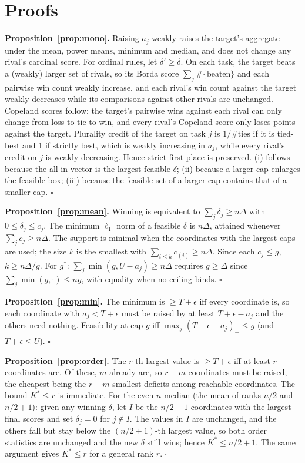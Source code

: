 \documentclass{article}
\theoremstyle{remark}
\begin{document}
\section{Proofs}\label{app:proofs}
\textbf{Proposition~\ref{prop:mono}.} Raising $a_j$ weakly raises the target's aggregate under the mean, power means, minimum and median, and does not change any rival's cardinal score. For ordinal rules, let $\delta'\ge\delta$. On each task, the target beats a (weakly) larger set of rivals, so its Borda score $\sum_j\#\{\text{beaten}\}$ and each pairwise win count weakly increase, and each rival's win count against the target weakly decreases while its comparisons against other rivals are unchanged. Copeland scores follow: the target's pairwise wins against each rival can only change from loss to tie to win, and every rival's Copeland score only loses points against the target. Plurality credit of the target on task $j$ is $1/\#\text{ties}$ if it is tied-best and 1 if strictly best, which is weakly increasing in $a_j$, while every rival's credit on $j$ is weakly decreasing. Hence strict first place is preserved. (i) follows because the all-in vector is the largest feasible $\delta$; (ii) because a larger cap enlarges the feasible box; (iii) because the feasible set of a larger cap contains that of a smaller cap. \hfill$\square$

\textbf{Proposition~\ref{prop:mean}.} Winning is equivalent to $\sum_j\delta_j\ge n\Delta$ with $0\le\delta_j\le c_j$. The minimum $\ell_1$ norm of a feasible $\delta$ is $n\Delta$, attained whenever $\sum_jc_j\ge n\Delta$. The support is minimal when the coordinates with the largest caps are used; the size $k$ is the smallest with $\sum_{i\le k}c_{(i)}\ge n\Delta$. Since each $c_j\le g$, $k\ge n\Delta/g$. For $g^\ast$: $\sum_j\min(g,U-a_j)\ge n\Delta$ requires $g\ge\Delta$ since $\sum_j\min(g,\cdot)\le ng$, with equality when no ceiling binds. \hfill$\square$

\textbf{Proposition~\ref{prop:min}.} The minimum is $\ge T+\epsilon$ iff every coordinate is, so each coordinate with $a_j<T+\epsilon$ must be raised by at least $T+\epsilon-a_j$ and the others need nothing. Feasibility at cap $g$ iff $\max_j(T+\epsilon-a_j)_+\le g$ (and $T+\epsilon\le U$). \hfill$\square$

\textbf{Proposition~\ref{prop:order}.} The $r$-th largest value is $\ge T+\epsilon$ iff at least $r$ coordinates are. Of these, $m$ already are, so $r-m$ coordinates must be raised, the cheapest being the $r-m$ smallest deficits among reachable coordinates. The bound $K^\ast\le r$ is immediate. For the even-$n$ median (the mean of ranks $n/2$ and $n/2+1$): given any winning $\delta$, let $I$ be the $n/2+1$ coordinates with the largest final scores and set $\delta_j=0$ for $j\notin I$. The values in $I$ are unchanged, and the others fall but stay below the $(n/2+1)$-th largest value, so both order statistics are unchanged and the new $\delta$ still wins; hence $K^\ast\le n/2+1$. The same argument gives $K^\ast\le r$ for a general rank $r$. \hfill$\square$
\end{document}
